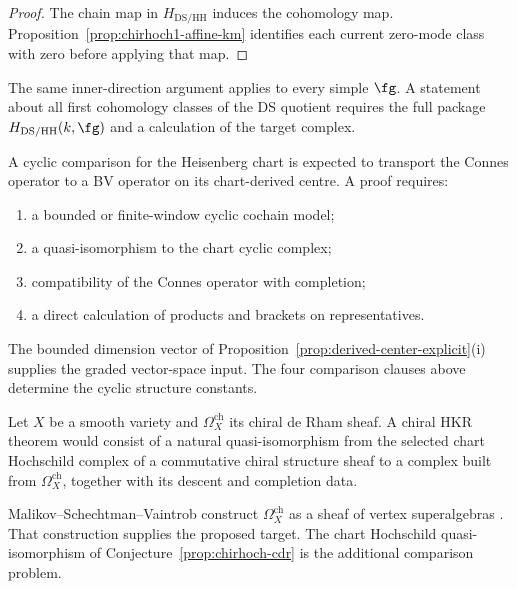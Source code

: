 \begin{proof}
The chain map in \(H_{\mathrm{DS/HH}}\) induces the cohomology map.
Proposition~\ref{prop:chirhoch1-affine-km} identifies each current
zero-mode class with zero before applying that map.
\end{proof}

\begin{remark}
\label{rem:ds-chirhoch-sl-n}
The same inner-direction argument applies to every simple \(\fg\).
A statement about all first cohomology classes of the DS quotient
requires the full package \(H_{\mathrm{DS/HH}}(k,\fg)\) and a
calculation of the target complex.
\end{remark}

\begin{conjecture}
\label{prop:heisenberg-bv-structure}
A cyclic comparison for the Heisenberg chart is expected to transport
the Connes operator to a BV operator on its chart-derived centre.
A proof requires:
\begin{enumerate}[label=\textup{(\roman*)}]
\item a bounded or finite-window cyclic cochain model;
\item a quasi-isomorphism to the chart cyclic complex;
\item compatibility of the Connes operator with completion;
\item a direct calculation of products and brackets on representatives.
\end{enumerate}
The bounded dimension vector of
Proposition~\ref{prop:derived-center-explicit}(i) supplies the graded
vector-space input.  The four comparison clauses above determine the
cyclic structure constants.
\end{conjecture}

\begin{conjecture}
\label{prop:chirhoch-cdr}
Let \(X\) be a smooth variety and
\(\Omega_X^{\mathrm{ch}}\) its chiral de Rham sheaf.  A chiral HKR
theorem would consist of a natural quasi-isomorphism from the selected
chart Hochschild complex of a commutative chiral structure sheaf to a
complex built from \(\Omega_X^{\mathrm{ch}}\), together with its
descent and completion data.
\end{conjecture}

\begin{remark}[Attribution]
\label{rem:chirhoch-cdr-attribution}
Malikov--Schechtman--Vaintrob construct
\(\Omega_X^{\mathrm{ch}}\) as a sheaf of vertex superalgebras
\cite{MSV99}.  That construction supplies the proposed target.  The
chart Hochschild quasi-isomorphism of
Conjecture~\ref{prop:chirhoch-cdr} is the additional comparison
problem.
\end{remark}

